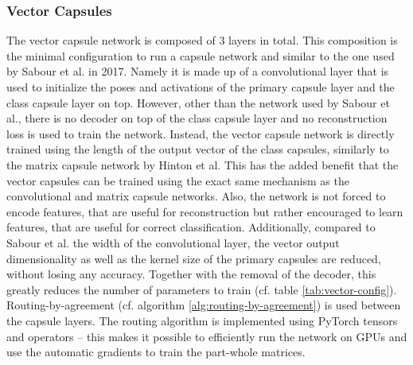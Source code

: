 \subsubsection{Vector Capsules}
The vector capsule network is composed of 3 layers in total. This composition is the minimal configuration to run a capsule network and similar to the one used by Sabour et al. in 2017. Namely it is made up of a convolutional layer that is used to initialize the poses and activations of the primary capsule layer and the class capsule layer on top. However, other than the network used by Sabour et al., there is no decoder on top of the class capsule layer and no reconstruction loss is used to train the network. Instead, the vector capsule network is directly trained using the length of the output vector of the class capsules, similarly to the matrix capsule network by Hinton et al. This has the added benefit that the vector capsules can be trained using the exact same mechanism as the convolutional and matrix capsule networks. Also, the network is not forced to encode features, that are useful for reconstruction but rather encouraged to learn features, that are useful for correct classification. Additionally, compared to Sabour et al. the width of the convolutional layer, the vector output dimensionality as well as the kernel size of the primary capsules are reduced, without losing any accuracy. Together with the removal of the decoder, this greatly reduces the number of parameters to train (cf. table \ref{tab:vector-config}). Routing-by-agreement (cf. algorithm \ref{alg:routing-by-agreement}) is used between the capsule layers. The routing algorithm is implemented using PyTorch tensors and operators -- this makes it possible to efficiently run the network on GPUs and use the automatic gradients to train the part-whole matrices.
